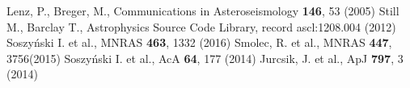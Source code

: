 \documentclass[epj,twocolumn]{webofc}
\begin{document}
% 
%
%

\begin{thebibliography}{}

Lenz, P., Breger, M.,  Communications in Asteroseismology \textbf{146}, 53 (2005)
Still M., Barclay T., Astrophysics Source Code Library, record
ascl:1208.004 (2012)
Soszy{\'n}ski I. et al., MNRAS \textbf{463}, 1332 (2016)
Smolec, R. et al., MNRAS \textbf{447}, 3756(2015)
Soszy{\'n}ski I. et al., AcA \textbf{64}, 177 (2014)
Jurcsik, J. et al., ApJ \textbf{797}, 3 (2014)
\end{thebibliography}

\end{document}
